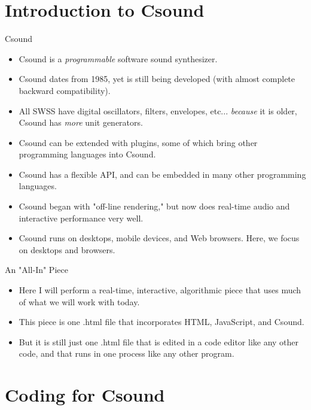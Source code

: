 \documentclass{beamer}
\begin{document}
    \section{Introduction to Csound}
    \begin{frame}{Csound}
        \begin{itemize}
            \item Csound is a \textit{programmable} software sound synthesizer.
            \item Csound dates from 1985, yet is still being developed (with almost
            complete backward compatibility).
            \item All SWSS have digital oscillators, filters, envelopes, etc...
            \textit{because} it is older, Csound has \textit{more} unit generators.
            \item Csound can be extended with plugins, some of which bring other
            programming languages into Csound. 
            \item Csound has a flexible API, and can be embedded in many other
            programming languages.
            \item Csound began with "off-line rendering," but now does real-time
            audio and interactive performance very well.
            \item Csound runs on desktops, mobile devices, and Web
            browsers. Here, we focus on desktops and browsers.
        \end{itemize}
    \end{frame}
    \begin{frame}{An "All-In" Piece}
        \begin{itemize}
            \item Here I will perform a real-time, interactive, algorithmic piece
            that uses much of what we will work with today.
            \item This piece is one .html file that incorporates  HTML, JavaScript, and Csound.
            \item But it is still just one .html file that is edited in a code editor
            like any other code, and that runs in one process like any other program.
        \end{itemize}
    \end{frame}
    
    \section{Coding for Csound}
    
\end{document}
